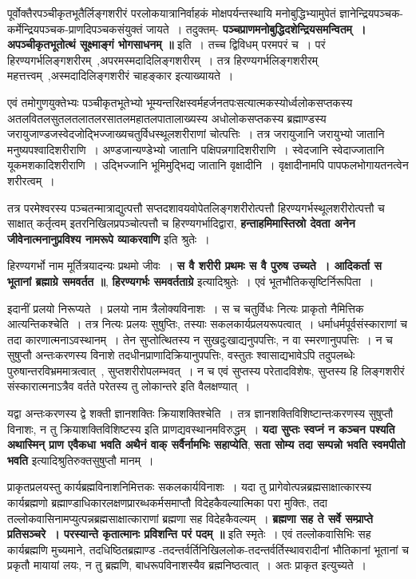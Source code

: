 	पूर्वोक्तैरपञ्चीकृतभूतैर्लिङ्गशरीरं परलोकयात्रानिर्वाहकं मोक्षपर्यन्तस्थायि मनोबुद्धिभ्यामुपेतं ज्ञानेन्द्रियपञ्चक-कर्मेन्द्रियपञ्चक-प्राणदिपञ्चकसंयुक्तं जायते~। तदुक्तम्- {\bfseries पञ्चप्राणमनोबुद्धिदशेन्द्रियसमन्वितम्~। अपञ्चीकृतभूतोत्थं सूक्ष्माङ्गं भोगसाधनम् ॥} इति~। तच्च द्विविधम् परमपरं च~। परं हिरण्यगर्भलिङ्गशरीरम्~,अपरमस्मदादिलिङ्गशरीरम्~। तत्र हिरण्यगर्भलिङ्गशरीरम् महत्तत्त्वम्~,अस्मदादिलिङ्गशरीरं चाहङ्कार इत्याख्यायते~।\par
	एवं तमोगुणयुक्तेभ्यः पञ्चीकृतभूतेभ्यो भूम्यन्तरिक्षस्वर्महर्जनतपःसत्यात्मकस्योर्ध्वलोकसप्तकस्य अतलवितलसुतलतलातलरसातलमहातलपातालाख्यस्य अधोलोकसप्तकस्य ब्रह्माण्डस्य जरायुजाण्डजस्वेदजोद्भिज्जाख्यचतुर्विधस्थूलशरीराणां चोत्पत्तिः~। तत्र जरायुजानि जरायुभ्यो जातानि मनुष्यपश्वादिशरीराणि~। अण्डजान्यण्डेभ्यो जातानि पक्षिपन्नगादिशरीराणि~। स्वेदजानि स्वेदाज्जातानि यूकमशकादिशरीराणि~। उद्भिज्जानि भूमिमुद्भिद्य जातानि वृक्षादीनि~। वृक्षादीनामपि पापफलभोगायतनत्वेन शरीरत्वम्~।\par
	तत्र परमेश्वरस्य पञ्चतन्मात्राद्युत्पत्तौ सप्तदशावयवोपेतलिङ्गशरीरोत्पत्तौ हिरण्यगर्भस्थूलशरीरोत्पत्तौ च साक्षात् कर्तृत्वम् इतरनिखिलप्रपञ्चोत्पत्तौ च हिरण्यगर्भादिद्वारा, {\bfseries हन्ताहमिमास्तिस्रो देवता अनेन जीवेनात्मनानुप्रविश्य नामरूपे व्याकरवाणि} इति श्रुतेः~।\par
	हिरण्यगर्भो नाम मूर्तित्रयादन्यः प्रथमो जीवः~। {\bfseries स वै शरीरी प्रथमः स वै पुरुष उच्यते~। आदिकर्ता स भूतानां ब्रह्माग्रे समवर्तत ॥}, {\bfseries हिरण्यगर्भः समवर्तताग्रे} इत्यादिश्रुतेः~। एवं भूतभौतिकसृष्टिर्निरूपिता~।\par
	इदानीं प्रलयो निरूप्यते~। प्रलयो नाम त्रैलोक्यविनाशः~। स च चतुर्विधः नित्यः प्राकृतो नैमित्तिक आत्यन्तिकश्चेति~। तत्र नित्यः प्रलयः सुषुप्तिः, तस्याः सकलकार्यप्रलयरूपत्वात्~। धर्माधर्मपूर्वसंस्काराणां च तदा कारणात्मनाऽवस्थानम्~। तेन सुप्तोत्थितस्य न सुखदुःखाद्यनुपपत्तिः, न वा स्मरणानुपपत्तिः~। न च सुषुप्तौ अन्तःकरणस्य विनाशे तदधीनप्राणादिक्रियानुपपत्तिः, वस्तुतः श्वासाद्यभावेऽपि तदुपलब्धेः पुरुषान्तरविभ्रममात्रत्वात्~, सुप्तशरीरोपलम्भवत्~। न च एवं सुप्तस्य परेतादविशेषः, सुप्तस्य हि लिङ्गशरीरं संस्कारात्मनाऽत्रैव वर्तते परेतस्य तु लोकान्तरे इति वैलक्षण्यात्~।\par
	यद्वा अन्तःकरणस्य द्वे शक्ती ज्ञानशक्तिः क्रियाशक्तिश्चेति~। तत्र ज्ञानशक्तिविशिष्टान्तःकरणस्य सुषुप्तौ विनाशः, न तु क्रियाशक्तिविशिष्टस्य इति प्राणद्यवस्थानमविरुद्धम्~। {\bfseries यदा सुप्तः स्वप्नं न कञ्चन पश्यति अथास्मिन् प्राण एवैकधा भवति अथैनं वाक् सर्वैर्नामभिः सहाप्येति}, {\bfseries सता सोम्य तदा सम्पन्नो भवति स्वमपीतो भवति} इत्यादिश्रुतिरुक्तसुषुप्तौ मानम्~।\par
	प्राकृतप्रलयस्तु कार्यब्रह्मविनाशनिमित्तकः सकलकार्यविनाशः~। यदा तु प्रागेवोत्पन्नब्रह्मसाक्षात्कारस्य कार्यब्रह्मणो ब्रह्माण्डाधिकारलक्षणप्रारब्धकर्मसमाप्तौ विदेहकैवल्यात्मिका परा मुक्तिः, तदा तल्लोकवासिनामप्युत्पन्नब्रह्मसाक्षात्काराणां ब्रह्मणा सह विदेहकैवल्यम्~। {\bfseries ब्रह्मणा सह ते सर्वे सम्प्राप्ते प्रतिसञ्चरे~। परस्यान्ते कृतात्मानः प्रविशन्ति परं पदम् ॥} इति स्मृतेः~। एवं तल्लोकवासिभिः सह कार्यब्रह्मणि मुच्यमाने, तदधिष्ठितब्रह्माण्ड -तदन्तर्वर्तिनिखिललोक-तदन्तर्वर्तिस्थावरादीनां भौतिकानां भूतानां च प्रकृतौ मायायां लयः, न तु ब्रह्मणि, बाधरूपविनाशस्यैव ब्रह्मनिष्ठत्वात्~। अतः प्राकृत इत्युच्यते~।\par
